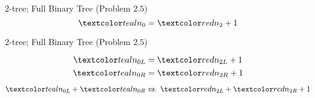 \begin{frame}{}
  \begin{exampleblock}{$2$-tree; Full Binary Tree (Problem $2.5$)}
    \[
      \teal{n_0} = \red{n_2} + 1
    \]
  \end{exampleblock}

  \vspace{0.50cm}
  \centerline{}
\end{frame}

\begin{frame}{}
  \begin{exampleblock}{$2$-tree; Full Binary Tree (Problem $2.5$)}
  \end{exampleblock}
  
  \pause
  \[
    \teal{n_{0L}} = \red{n_{2L}} + 1
  \]
  \[
    \teal{n_{0R}} = \red{n_{2R}} + 1
  \]

  \pause
  \[
    \teal{n_{0L}} + \teal{n_{0R}} \;\text{\it vs. } \red{n_{2L}} + \red{n_{2R}} + 1
  \]
\end{frame}
